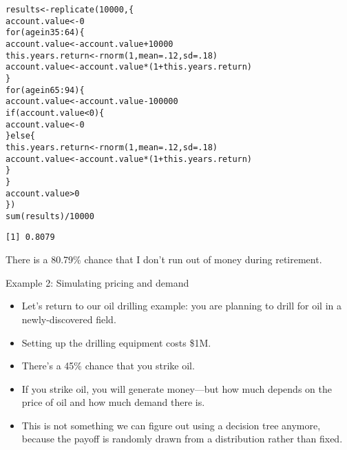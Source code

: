 \documentclass{beamer}\usepackage[]{graphicx}\usepackage[]{color}
\makeatletter
\newcommand{\hlnum}[1]{\textcolor[rgb]{0.824,0.412,0.118}{#1}}%
\newcommand{\hlopt}[1]{\textcolor[rgb]{1,0.894,0.769}{#1}}%
\newcommand{\hlstd}[1]{\textcolor[rgb]{1,0.894,0.769}{#1}}%
\newcommand{\hlkwa}[1]{\textcolor[rgb]{0.941,0.902,0.549}{#1}}%
\newcommand{\hlkwb}[1]{\textcolor[rgb]{0.804,0.776,0.451}{#1}}%
\newcommand{\hlkwc}[1]{\textcolor[rgb]{0.78,0.941,0.545}{#1}}%
\newcommand{\hlkwd}[1]{\textcolor[rgb]{1,0.78,0.769}{#1}}%
\newenvironment{kframe}{%
 \def\at@end@of@kframe{}%
 \ifinner\ifhmode%
  \def\at@end@of@kframe{\end{minipage}}%
  \begin{minipage}{\columnwidth}%
 \fi\fi%
 \def\FrameCommand##1{\hskip\@totalleftmargin \hskip-\fboxsep
 \colorbox{shadecolor}{##1}\hskip-\fboxsep
     \hskip-\linewidth \hskip-\@totalleftmargin \hskip\columnwidth}%
 \MakeFramed {\advance\hsize-\width
   \@totalleftmargin\z@ \linewidth\hsize
   \@setminipage}}%
 {\par\unskip\endMakeFramed%
 \at@end@of@kframe}
\newenvironment{knitrout}{}{} %
\makeatother
\begin{document}
\begin{darkframes}
    \begin{frame}[fragile]
      \fontsize{9}{9}\selectfont
\begin{knitrout}
\begin{kframe}
\begin{alltt}
\hlstd{results} \hlkwb{<-} \hlkwd{replicate}\hlstd{(}\hlnum{10000}\hlstd{, \{}
  \hlstd{account.value} \hlkwb{<-} \hlnum{0}
  \hlkwa{for} \hlstd{(age} \hlkwa{in} \hlnum{35}\hlopt{:}\hlnum{64}\hlstd{) \{}
    \hlstd{account.value} \hlkwb{<-} \hlstd{account.value} \hlopt{+} \hlnum{10000}
    \hlstd{this.years.return} \hlkwb{<-} \hlkwd{rnorm}\hlstd{(}\hlnum{1}\hlstd{,} \hlkwc{mean}\hlstd{=}\hlnum{.12}\hlstd{,} \hlkwc{sd}\hlstd{=}\hlnum{.18}\hlstd{)}
    \hlstd{account.value} \hlkwb{<-} \hlstd{account.value} \hlopt{*} \hlstd{(}\hlnum{1} \hlopt{+} \hlstd{this.years.return)}
  \hlstd{\}}
  \hlkwa{for} \hlstd{(age} \hlkwa{in} \hlnum{65}\hlopt{:}\hlnum{94}\hlstd{) \{}
    \hlstd{account.value} \hlkwb{<-} \hlstd{account.value} \hlopt{-} \hlnum{100000}
    \hlkwa{if} \hlstd{(account.value} \hlopt{<} \hlnum{0}\hlstd{) \{}
      \hlstd{account.value} \hlkwb{<-} \hlnum{0}
    \hlstd{\}} \hlkwa{else} \hlstd{\{}
      \hlstd{this.years.return} \hlkwb{<-} \hlkwd{rnorm}\hlstd{(}\hlnum{1}\hlstd{,} \hlkwc{mean}\hlstd{=}\hlnum{.12}\hlstd{,} \hlkwc{sd}\hlstd{=}\hlnum{.18}\hlstd{)}
      \hlstd{account.value} \hlkwb{<-} \hlstd{account.value} \hlopt{*} \hlstd{(}\hlnum{1} \hlopt{+} \hlstd{this.years.return)}
    \hlstd{\}}
  \hlstd{\}}
  \hlstd{account.value} \hlopt{>} \hlnum{0}
\hlstd{\})}
\hlkwd{sum}\hlstd{(results)} \hlopt{/} \hlnum{10000}
\end{alltt}
\begin{verbatim}
[1] 0.8079
\end{verbatim}
\end{kframe}
\end{knitrout}
      \pause
      There is a 80.79\% chance that I don't run out of money during retirement.
    \end{frame}

    \begin{frame}{Example 2: Simulating pricing and demand}
      \begin{itemize}[<+->]
        \item Let's return to our oil drilling example: you are planning to drill for oil in a newly-discovered field.
        \item Setting up the drilling equipment costs \$1M.
        \item There's a 45\% chance that you strike oil.
        \item If you strike oil, you will generate money---\pause but how much depends on the price of oil and how much demand there is.
        \item This is not something we can figure out using a decision tree anymore, because the payoff is randomly drawn from a distribution rather than fixed.
      \end{itemize}
    \end{frame}


\end{darkframes}
\end{document}
